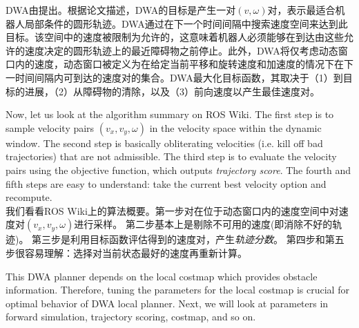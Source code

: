 
DWA由\cite{fox1997dynamic}提出。根据论文描述，DWA的目标是产生一对$(v,\omega)$对，表示最适合机器人局部条件的圆形轨迹。DWA通过在下一个时间间隔中搜索速度空间来达到此目标。该空间中的速度被限制为允许的，这意味着机器人必须能够在到达由这些允许的速度决定的圆形轨迹上的最近障碍物之前停止。此外，DWA将仅考虑动态窗口内的速度，动态窗口被定义为在给定当前平移和旋转速度和加速度的情况下在下一时间间隔内可到达的速度对的集合。DWA最大化目标函数，其取决于（1）到目标的进展，（2）从障碍物的清除，以及（3）前向速度以产生最佳速度对。

Now, let us look at the algorithm summary on ROS Wiki. The first step is to sample velocity pairs $(v_x, v_y, \omega)$ in
the velocity space within the dynamic window. The second step is basically obliterating velocities (i.e. kill off bad trajectories) that are not admissible. The third step is
to evaluate the velocity pairs using the objective function, which outputs \textit{trajectory score}. The fourth and fifth steps are easy to understand: take the current best
velocity option and recompute.\\

我们看看ROS Wiki上的算法概要。第一步对在位于动态窗口内的速度空间中对速度对$(v_x, v_y, \omega)$进行采样。
第二步基本上是剔除不可用的速度(即消除不好的轨迹)。
第三步是利用目标函数评估得到的速度对，产生\emph{轨迹分数}。
第四步和第五步很容易理解：选择对当前状态最好的速度再重新计算。


This DWA planner depends on the local costmap which provides obstacle information. Therefore, tuning the parameters for the local costmap is crucial for optimal behavior of DWA local planner. Next, we will look at parameters in forward simulation, trajectory scoring, costmap, and so on.

